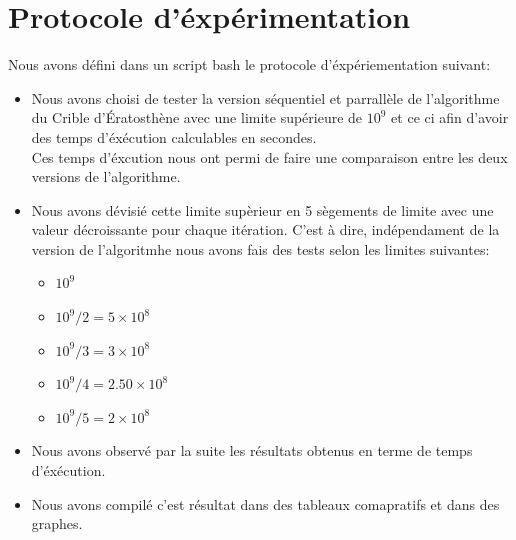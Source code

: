 \documentclass{report}
\begin{document}
\section{Protocole d'éxpérimentation}
Nous avons défini dans un script bash le protocole d'éxpériementation suivant:
\begin{itemize}
	\item Nous avons choisi de tester la version séquentiel et parrallèle de l'algorithme du Crible d'Ératosthène
	avec une limite supérieure de $10^{9}$ et ce ci afin d'avoir des temps d'éxécution calculables
	en secondes.\\
	Ces temps d'éxcution nous ont permi de faire une comparaison entre les deux versions de l'algorithme.
	\item Nous avons dévisié cette limite supèrieur en 5 sègements de limite avec une valeur décroissante pour chaque itération.
	C'est à dire, indépendament de la version de l'algoritmhe nous avons fais des tests selon les limites suivantes:
	\begin{itemize}
		\item $10^{9}$
		\item $10^{9}/2=5\times10^{8}$
		\item $10^{9}/3=3\times10^{8}$
		\item $10^{9}/4=2.50\times10^{8}$
		\item $10^{9}/5=2\times10^{8}$
	\end{itemize}
	\item Nous avons observé par la suite les résultats obtenus en terme de temps d'éxécution.
	\item Nous avons compilé c'est résultat dans des tableaux comapratifs et dans des graphes.
\end{itemize}
\newpage
\end{document}
